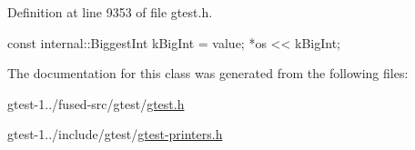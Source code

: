 \-Definition at line 9353 of file gtest.\-h.


\begin{DoxyCode}
                                                         {
    const internal::BiggestInt kBigInt = value;
    *os << kBigInt;
  }
\end{DoxyCode}


\-The documentation for this class was generated from the following files\-:\begin{DoxyCompactItemize}
\item 
gtest-\/1../fused-\/src/gtest/\hyperlink{fused-src_2gtest_2gtest_8h}{gtest.\-h}\item 
gtest-\/1../include/gtest/\hyperlink{gtest-printers_8h}{gtest-\/printers.\-h}\end{DoxyCompactItemize}
